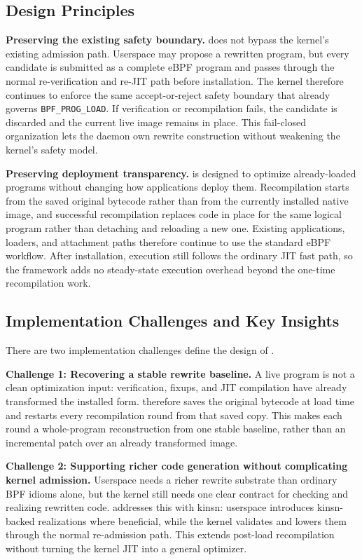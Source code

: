 \subsection{Design Principles}
\label{sec:rejit-principles}

\noindent\textbf{Preserving the existing safety boundary.}
\tool does not bypass the kernel's existing admission path. Userspace may propose a rewritten program, but every candidate is submitted as a complete eBPF program and passes through the normal re-verification and re-JIT path before installation. The kernel therefore continues to enforce the same accept-or-reject safety boundary that already governs \texttt{BPF\_PROG\_LOAD}. If verification or recompilation fails, the candidate is discarded and the current live image remains in place. This fail-closed organization lets the daemon own rewrite construction without weakening the kernel's safety model.

\noindent\textbf{Preserving deployment transparency.}
\tool is designed to optimize already-loaded programs without changing how applications deploy them. Recompilation starts from the saved original bytecode rather than from the currently installed native image, and successful recompilation replaces code in place for the same logical program rather than detaching and reloading a new one. Existing applications, loaders, and attachment paths therefore continue to use the standard eBPF workflow. After installation, execution still follows the ordinary JIT fast path, so the framework adds no steady-state execution overhead beyond the one-time recompilation work.

\subsection{Implementation Challenges and Key Insights}
\label{sec:rejit-challenges}

There are two implementation challenges define the design of \tool.

\noindent\textbf{Challenge 1: Recovering a stable rewrite baseline.}
A live program is not a clean optimization input: verification, fixups, and JIT compilation have already transformed the installed form. \tool therefore saves the original bytecode at load time and restarts every recompilation round from that saved copy. This makes each round a whole-program reconstruction from one stable baseline, rather than an incremental patch over an already transformed image.

\noindent\textbf{Challenge 2: Supporting richer code generation without complicating kernel admission.}
Userspace needs a richer rewrite substrate than ordinary BPF idioms alone, but the kernel still needs one clear contract for checking and realizing rewritten code. \tool addresses this with kinsn: userspace introduces kinsn-backed realizations where beneficial, while the kernel validates and lowers them through the normal re-admission path. This extends post-load recompilation without turning the kernel JIT into a general optimizer.

